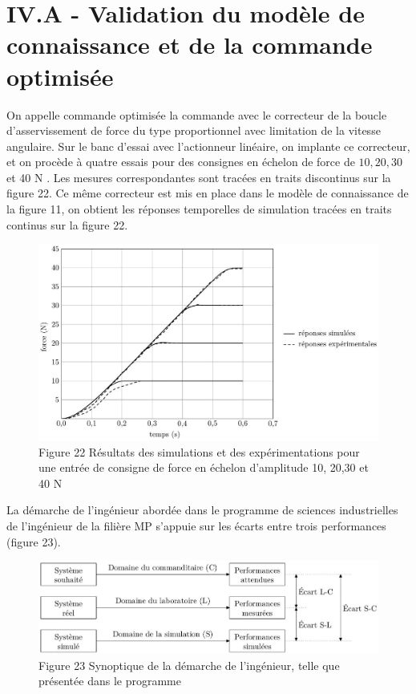 \documentclass[10pt]{article}
\begin{document}
\section{IV.A - Validation du modèle de connaissance et de la commande optimisée}
On appelle commande optimisée la commande avec le correcteur de la boucle d'asservissement de force du type proportionnel avec limitation de la vitesse angulaire. Sur le banc d'essai avec l'actionneur linéaire, on implante ce correcteur, et on procède à quatre essais pour des consignes en échelon de force de $10,20,30$ et 40 N . Les mesures correspondantes sont tracées en traits discontinus sur la figure 22. Ce même correcteur est mis en place dans le modèle de connaissance de la figure 11, on obtient les réponses temporelles de simulation tracées en traits continus sur la figure 22.

\begin{figure}[h]
\begin{center}
  \includegraphics[width=\textwidth]{2025_09_16_5f2d7643f7e649c6833dg-15(1)}
\captionsetup{labelformat=empty}
\caption{Figure 22 Résultats des simulations et des expérimentations pour une entrée de consigne de force en échelon d'amplitude 10, 20,30 et 40 N}
\end{center}
\end{figure}

La démarche de l'ingénieur abordée dans le programme de sciences industrielles de l'ingénieur de la filière MP s'appuie sur les écarts entre trois performances (figure 23).

\begin{figure}[h]
\begin{center}
  \includegraphics[width=\textwidth]{2025_09_16_5f2d7643f7e649c6833dg-15}
\captionsetup{labelformat=empty}
\caption{Figure 23 Synoptique de la démarche de l'ingénieur, telle que présentée dans le programme}
\end{center}
\end{figure}
\end{document}
